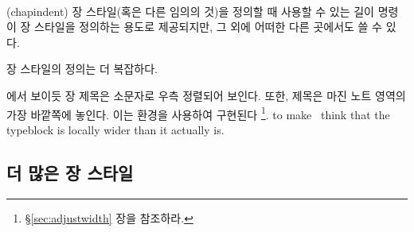 \begin{syntax}
\lnc{\chapindent} \\
\end{syntax}
\glossary(chapindent)%
  {}%
  {장 스타일(혹은 다른 임의의 것)을 정의할 때 사용할 수 있는 길이}
\lnc{\chapindent} 명령이 장 스타일을 정의하는 용도로 제공되지만,
그 외에 어떠한 다른 곳에서도 쓸 수 있다.

 장 스타일의 정의는 더 복잡하다.
\begin{lcode}
\end{lcode}

에서 보이듯 장 제목은 소문자로 우측 정렬되어 보인다.
또한, 제목은 마진 노트 영역의 가장 바깥쪽에 놓인다.
이는  환경을 사용하여 구현된다 \footnote{\S\ref{sec:adjustwidth} 장을 참조하라.}.
to make \ltx\ think that the typeblock is locally wider than it actually is.

\subsection{더 많은 장 스타일}

